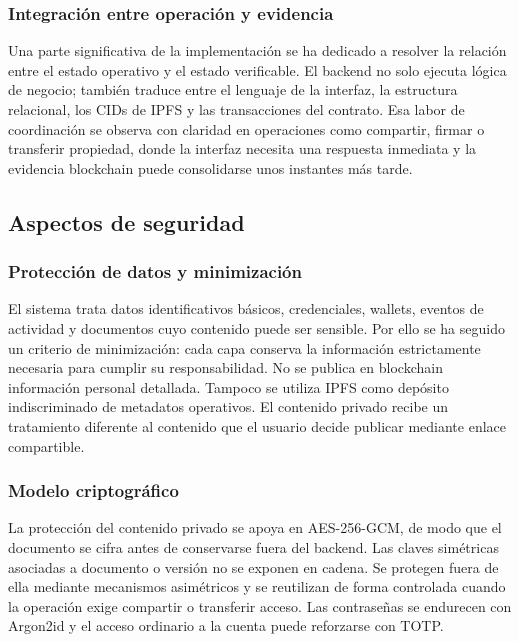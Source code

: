 \documentclass[11pt, a4paper]{article}
\begin{document}
\subsubsection{Integración entre operación y evidencia}

Una parte significativa de la implementación se ha dedicado a resolver la relación entre el estado operativo y el estado verificable. El backend no solo ejecuta lógica de negocio; también traduce entre el lenguaje de la interfaz, la estructura relacional, los CIDs de IPFS y las transacciones del contrato. Esa labor de coordinación se observa con claridad en operaciones como compartir, firmar o transferir propiedad, donde la interfaz necesita una respuesta inmediata y la evidencia blockchain puede consolidarse unos instantes más tarde.

\subsection{Aspectos de seguridad}

\subsubsection{Protección de datos y minimización}

El sistema trata datos identificativos básicos, credenciales, wallets, eventos de actividad y documentos cuyo contenido puede ser sensible. Por ello se ha seguido un criterio de minimización: cada capa conserva la información estrictamente necesaria para cumplir su responsabilidad. No se publica en blockchain información personal detallada. Tampoco se utiliza IPFS como depósito indiscriminado de metadatos operativos. El contenido privado recibe un tratamiento diferente al contenido que el usuario decide publicar mediante enlace compartible.

\subsubsection{Modelo criptográfico}

La protección del contenido privado se apoya en AES-256-GCM, de modo que el documento se cifra antes de conservarse fuera del backend. Las claves simétricas asociadas a documento o versión no se exponen en cadena. Se protegen fuera de ella mediante mecanismos asimétricos y se reutilizan de forma controlada cuando la operación exige compartir o transferir acceso. Las contraseñas se endurecen con Argon2id y el acceso ordinario a la cuenta puede reforzarse con TOTP.
\end{document}
